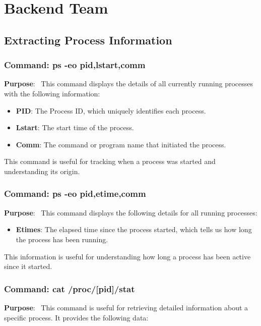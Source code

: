 \documentclass[12pt]{article}
\begin{document}
\section{Backend Team}
\subsection{Extracting Process Information}
\subsubsection{Command: ps -eo pid,lstart,comm}

\textbf{Purpose}: \
This command displays the details of all currently running processes with the following information:

\begin{itemize}
    \item \textbf{PID}: The Process ID, which uniquely identifies each process.
    \item \textbf{Lstart}: The start time of the process.
    \item \textbf{Comm}: The command or program name that initiated the process.
\end{itemize}

This command is useful for tracking when a process was started and understanding its origin.

\subsubsection{Command: ps -eo pid,etime,comm}

\textbf{Purpose}: \
This command displays the following details for all running processes:

\begin{itemize}
    \item \textbf{Etimes}: The elapsed time since the process started, which tells us how long the process has been running.
\end{itemize}

This information is useful for understanding how long a process has been active since it started.

\subsubsection{Command: cat /proc/[pid]/stat}

\textbf{Purpose}: \
This command is useful for retrieving detailed information about a specific process. It provides the following data:
\end{document}
